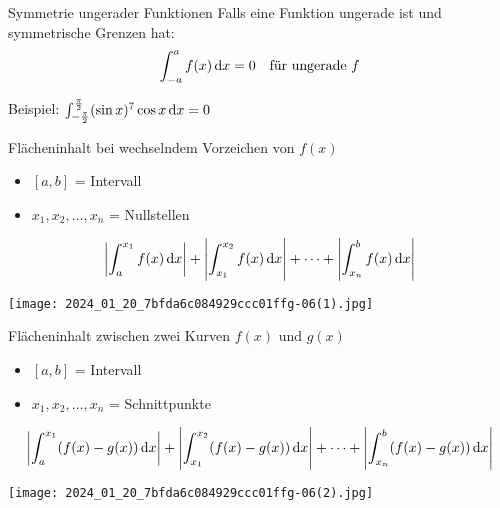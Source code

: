 \begin{concept}{Symmetrie ungerader Funktionen}
    Falls eine Funktion ungerade ist und symmetrische Grenzen hat:
    \begin{equation}
        \int_{-a}^{a} f(x) \dif x = 0 \quad \text{für ungerade } f
    \end{equation}

    Beispiel: $\int_{-\frac{\pi}{2}}^{\frac{\pi}{2}} (\sin x)^7 \cos x \dif x = 0$
\end{concept}

\begin{KR}{Flächeninhalt bei wechselndem Vorzeichen von $f(x)$}
    \begin{itemize}
      \item $[a, b]$ = Intervall
      \item $x_{1}, x_{2}, \ldots, x_{n}$ = Nullstellen
    \end{itemize}

    $$\left|\int_{a}^{x_{1}} f(x) \dif x\right|+\left|\int_{x_{1}}^{x_{2}} f(x) \dif x\right|+\cdots+\left|\int_{x_{n}}^{b} f(x) \dif x\right|$$
\end{KR}

\begin{center}
\texttt{[image: 2024\_01\_20\_7bfda6c084929ccc01ffg-06(1).jpg]}
\end{center}

\begin{KR}{Flächeninhalt zwischen zwei Kurven $f(x)$ und $g(x)$}
    \begin{itemize}
      \item $[a, b]$ = Intervall
      \item $x_{1}, x_{2}, \ldots, x_{n}$ = Schnittpunkte
    \end{itemize}
    $$\left|\int_{a}^{x_{1}}(f(x)-g(x)) \dif x\right|+\left|\int_{x_{1}}^{x_{2}}(f(x)-g(x)) \dif x\right|+\cdots+\left|\int_{x_{n}}^{b}(f(x)-g(x)) \dif x\right|$$
\end{KR}

\begin{center}
\texttt{[image: 2024\_01\_20\_7bfda6c084929ccc01ffg-06(2).jpg]}
\end{center}

